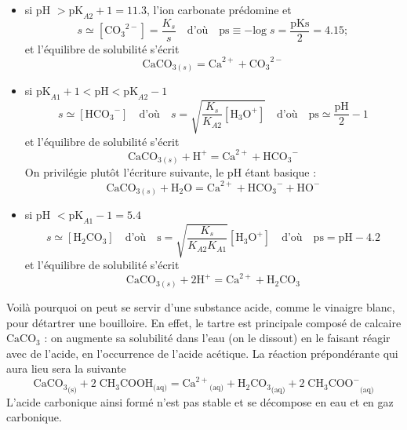 \documentclass[11pt,a4paper]{report}
\begin{document}
\begin{itemize}
	\item si pH $> \text{pK}_{A2} + 1 = 11.3 $, l'ion carbonate prédomine et
	\begin{equation}
		s \simeq [{\text{CO}_3}^{2-}] = \frac{K_s}{s} \quad\text{d'où}\quad 
		\text{ps} \equiv -\text{log}\;s = \frac{\text{pKs}}{2} = 4.15;
	\end{equation}
	et l'équilibre de solubilité s'écrit
	\begin{equation}
		\boxed{\text{CaCO}_{3(s)} = \text{Ca}^{2+} + {\text{CO}_3}^{2-}}
	\end{equation}
	\item si $\text{pK}_{A1} + 1 < \text{pH} < \text{pK}_{A2} - 1$
	\begin{equation}
			s \simeq [{\text{HCO}_3}^{-}] 
			\quad\text{d'où}\quad s = \sqrt{\frac{K_s}{K_{A2}}[\text{H}_3\text{O}^+]}
			\quad\text{d'où}\quad \text{ps} \simeq \frac{\text{pH}}{2} - 1
	\end{equation}
	et l'équilibre de solubilité s'écrit
	\begin{equation}
		\text{CaCO}_{3(s)} + \text{H}^+ = \text{Ca}^{2+} + {\text{HCO}_3}^{-} 
	\end{equation}
	On privilégie plutôt l'écriture suivante, le pH étant basique :
	\begin{equation}
		\boxed{\text{CaCO}_{3(s)} + \text{H}_2\text{O} 
		= \text{Ca}^{2+} + {\text{HCO}_3}^{-} + \text{HO}^-}
	\end{equation}
	\item si pH $< \text{pK}_{A1} - 1 = 5.4$
	\begin{equation}
		s \simeq [{\text{H}_2\text{CO}_3}] \quad\text{d'où}\quad 
		\boxed{\text{s} = \sqrt{\frac{K_s}{K_{A2}K_{A1}}}[\text{H}_3\text{O}^+]}
		\quad\text{d'où}\quad \text{ps} = \text{pH} - 4.2
	\end{equation}
	et l'équilibre de solubilité s'écrit
	\begin{equation}
		\boxed{\text{CaCO}_{3(s)} + 2\text{H}^+ = \text{Ca}^{2+} + {\text{H}_2\text{CO}_3}}
	\end{equation}
\end{itemize}

Voilà pourquoi on peut se servir d'une substance acide, comme le vinaigre blanc, pour détartrer une bouilloire. En effet, le tartre est principale composé de calcaire $\text{CaCO}_3$ : on augmente sa solubilité dans l'eau (on le dissout) en le faisant réagir avec de l'acide, en l'occurrence de l'acide acétique. La réaction prépondérante qui aura lieu sera la suivante
\begin{equation}
	{\text{CaCO}_3}_\text{(s)} + 2\;\text{CH}_3\text{COOH}_\text{(aq)} = {\text{Ca}^{2+}}_\text{(aq)} 
	+ {\text{H}_2\text{CO}_3}_\text{(aq)} + 2\;{{\text{CH}_3\text{COO}}^{-}}_\text{(aq)} 
\end{equation}
L'acide carbonique ainsi formé n'est pas stable et se décompose en eau et en gaz carbonique.\\
\end{document}
